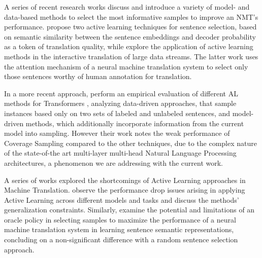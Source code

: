 A series of recent research works discuss and introduce a variety of model- and data-based methods to select the most informative samples to improve an NMT's performance.
\citet{zhang2018active} propose two active learning techniques for sentence selection, based on semantic similarity between the sentence embeddings and decoder probability as a token of translation quality, while \citet{peris2020active} explore the application of active learning methods in the interactive translation of large data streams. The latter work uses the attention mechanism of a neural machine translation system to select only those sentences worthy of human annotation for translation. 

In a more recent approach, \citet{zeng2019empirical} perform an empirical evaluation of different AL methods for Transformers \cite{vaswani2017attention}, analyzing data-driven approaches, that sample instances based only on two sets of labeled and unlabeled sentences, and model-driven methods, which additionally incorporate information from the current model into sampling. 
However their work notes the weak performance of Coverage Sampling compared to the other techniques, due to the complex nature of the state-of-the art multi-layer multi-head Natural Language Processing architectures, a phenomenon we are addressing with the current work.

A series of works explored the shortcomings of Active Learning approaches in Machine Translation. \cite{lowell2018practical} observe the performance drop issues arising in applying Active Learning across different models and tasks and discuss the methods' generalization constraints. Similarly, \citet{koshorek2019limits} examine the potential and limitations of an oracle policy in selecting samples to maximize the performance of a neural machine translation system in learning sentence semantic representations, concluding on a non-significant difference with a random sentence selection approach.
